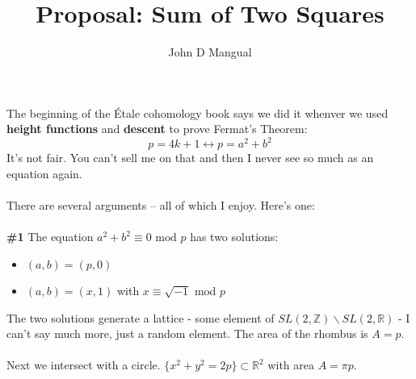 \documentclass[12pt]{article}
\title{\textbf{Proposal: Sum of Two Squares}}
\author{John D Mangual}
\date{}
\begin{document}
\selectfont \fontsize{20}{25}\selectfont

\maketitle

\noindent The beginning of the \'{E}tale cohomology book says we did it whenver we used \textbf{height functions} and \textbf{descent} to prove Fermat's Theorem:
$$ p = 4k+1 \leftrightarrow p = a^2 + b^2 $$ 
It's not fair.  You can't sell me on that and then I never see so much as an equation again.  \\ \\
There are several arguments -- all of which I enjoy. Here's one:\\ \\
\textbf{\#1} The equation $a^2 + b^2 \equiv 0 \text{ mod }p$ has two solutions:
\begin{itemize} 
\item $(a,b) = (p,0)$
\item $(a,b) = (x,1)$ with $x \equiv \sqrt{-1} \text{ mod } p$
\end{itemize}
The two solutions generate a lattice - some element of $SL(2, \mathbb{Z}) \backslash SL(2, \mathbb{R})$ - I can't say much more, just a random element. The area of the rhombus is $A = p$.\\ \\
Next we intersect with a circle. $\{ x^2 + y^2 = 2p\}\subset \mathbb{R}^2 $ with area $A = \pi p$.

\newpage
\end{document}
